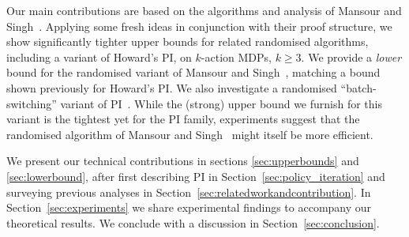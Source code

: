 Our main contributions are based on the algorithms and analysis of Mansour and Singh~. Applying some fresh ideas in conjunction with their proof structure, we show significantly tighter upper bounds for related randomised algorithms, including a variant of Howard's PI, on $k$-action MDPs, $k \geq 3$. We provide a \textit{lower} bound for the randomised variant of Mansour and Singh~, matching a bound shown previously for Howard's PI. We also investigate a randomised ``batch-switching'' variant of PI~\cite{Kalyanakrishnan+MG-bspi:2016}. While the (strong) upper bound we furnish for this variant is the tightest yet for the PI family, experiments suggest that the randomised algorithm of Mansour and Singh~ might itself be more efficient.

We present our technical contributions in sections \ref{sec:upperbounds} and \ref{sec:lowerbound}, after first describing PI in Section~\ref{sec:policy_iteration} and surveying previous analyses in Section~\ref{sec:relatedworkandcontribution}. In Section~\ref{sec:experiments} we share experimental findings to accompany our theoretical results. We conclude with a discussion in Section~\ref{sec:conclusion}.



